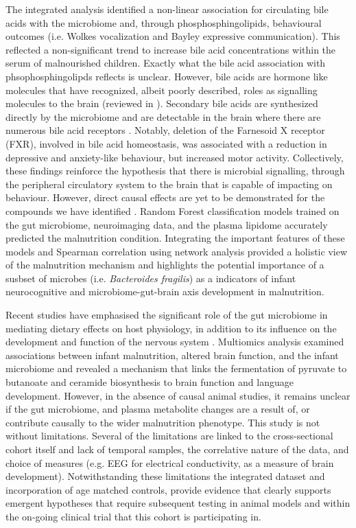 \documentclass{article}
\begin{document}
The integrated analysis identified a non-linear association for circulating bile acids with the microbiome and, through phosphosphingolipids, behavioural outcomes (i.e. Wolkes vocalization and Bayley expressive communication).
This reflected a non-significant trend to increase bile acid concentrations within the serum of malnourished children.
Exactly what the bile acid association with phsophosphingolipds reflects is unclear.
However, bile acids are hormone like molecules that have recognized, albeit poorly described, roles as signalling molecules to the brain (reviewed in \citet*{hurley2022bile}).
Secondary bile acids are synthesized directly by the microbiome and are detectable in the brain where there are numerous bile acid receptors \cite{hurley2022bile}.
Notably, deletion of the Farnesoid X receptor (FXR), involved in bile acid homeostasis, was associated with a reduction in depressive and anxiety-like behaviour, but increased motor activity.
Collectively, these findings reinforce the hypothesis that there is microbial signalling, through the peripheral circulatory system to the brain that is capable of impacting on behaviour.
However, direct causal effects are yet to be demonstrated for the compounds we have identified \cite{huang2015deletion}.
Random Forest classification models trained on the gut microbiome, neuroimaging data, and the plasma lipidome accurately predicted the malnutrition condition.
Integrating the important features of these models and Spearman correlation using network analysis provided a holistic view of the malnutrition mechanism and highlights the potential importance of a susbset of microbes (i.e. \textit{Bacteroides fragilis}) as a indicators of infant neurocognitive and microbiome-gut-brain axis development in malnutrition. 

Recent studies have emphasised the significant role of the gut microbiome in mediating dietary effects on host physiology, in addition to its influence on the development and function of the nervous system \cite{heiss2019role, ceppa2019current, marques2014gut, fung2017interactions}.
Multiomics analysis examined associations between infant malnutrition, altered brain function, and the infant microbiome and revealed a mechanism that links the fermentation of pyruvate to butanoate and ceramide biosynthesis to brain function and language development.
However, in the absence of causal animal studies, it remains unclear if the gut microbiome, and plasma metabolite changes are a result of, or contribute causally to the wider malnutrition phenotype. 
This study is not without limitations.
Several of the limitations are linked to the cross-sectional cohort itself and lack of temporal samples, the correlative nature of the data, and choice of measures (e.g. EEG for electrical conductivity, as a measure of brain development).
Notwithstanding these limitations the integrated dataset and incorporation of age matched controls, provide evidence that clearly supports emergent hypotheses that require subsequent testing in animal models and within the on-going clinical trial that this cohort is participating in.
\end{document}
